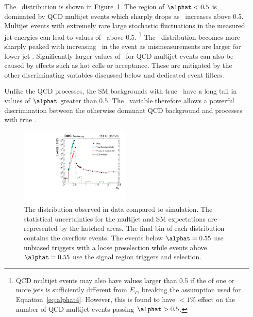 The \alphat~distribution is shown in Figure~\ref{fig:alphat-data}. The region of $\alphat < 0.5$ is dominated by
QCD multijet events which sharply drops as \alphat~increases above 0.5. Multijet events with
extremely rare large stochastic fluctuations in the measured jet energies can lead
to values of \alphat~above 0.5. \footnote{QCD multijet events may also have \alphat values larger than 0.5 if the 
\pt of one or more jets is sufficiently different from $E_T$, breaking the assumption used for Equation~\ref{eq:alphat4}. 
However, this is found to have $< 1\%$ effect on the number of QCD multijet events passing $\alphat > 0.5$.}
The \alphat~distribution becomes more sharply peaked with increasing \scalht~in the event as mismeasurements are larger
 for lower jet \pt. Significantly larger values of \alphat~for QCD multijet events can also be caused by effects such as 
hot cells or acceptance. These are mitigated by the other discriminating variables 
discussed below and dedicated event filters. 

Unlike the QCD processes, the SM backgrounds with true \met~have a long tail in
values of $\alphat$ greater than 0.5. The \alphat~variable therefore allows a powerful discrimination 
between the otherwise dominant QCD background and processes with true \met.

\begin{figure}[!htb]
  \centering
    \includegraphics[width=0.49\textwidth]{./Figures/alphat/alphat_data.pdf}
  \caption{
    The \alphat distribution observed in data compared to simulation. 
    The statistical uncertainties for the multijet and SM
    expectations are represented by the hatched areas. 
    The final bin of each distribution contains the overflow events. The events below $\alphat= 0.55$ use unbiased triggers with
    a loose preselection while events above $\alphat = 0.55$ use the signal region triggers and selection.
    }
  \label{fig:alphat-data}
\end{figure}

